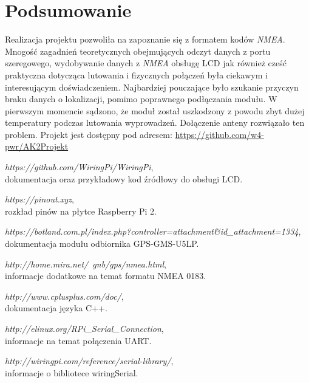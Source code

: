 \documentclass{article}
\begin{document}
\section{Podsumowanie}
	Realizacja projektu pozwoliła na zapoznanie się z formatem kodów \textit{NMEA}. Mnogość zagadnień teoretycznych obejmujących odczyt danych z portu szeregowego, wydobywanie danych z \textit{NMEA} obsługę LCD jak również cześć praktyczna dotycząca lutowania i fizycznych połączeń była ciekawym i interesującym doświadczeniem. Najbardziej pouczające było szukanie przyczyn braku danych o lokalizacji, pomimo poprawnego podłączania modułu. W pierwszym momencie sądzono, że moduł został uszkodzony z powodu zbyt dużej temperatury podczas lutowania wyprowadzeń. Dołączenie anteny rozwiązało ten problem. Projekt jest dostępny pod adresem: \url{https://github.com/w4-pwr/AK2Projekt}
\newpage
	\begin{thebibliography}{999}
		{\em https://github.com/WiringPi/WiringPi}, \\
		dokumentacja oraz przykładowy kod źródłowy do obsługi LCD.
		
		{\em https://pinout.xyz}, \\
		rozkład pinów na płytce Raspberry Pi 2.
		
				{\em https://botland.com.pl/index.php?controller=attachment\&id\_attachment=1334}, \\
				dokumentacja modułu odbiornika GPS-GMS-U5LP.
				
		{\em http://home.mira.net/~gnb/gps/nmea.html}, \\
		informacje dodatkowe na temat formatu NMEA 0183.
		
				{\em http://www.cplusplus.com/doc/}, \\
				dokumentacja języka C++.
		
						{\em http://elinux.org/RPi\_Serial\_Connection}, \\
						informacje na temat połączenia UART.
		
		{\em 	http://wiringpi.com/reference/serial-library/}, \\
		informacje o bibliotece wiringSerial.

		
		
		
	\end{thebibliography}	
\end{document}
